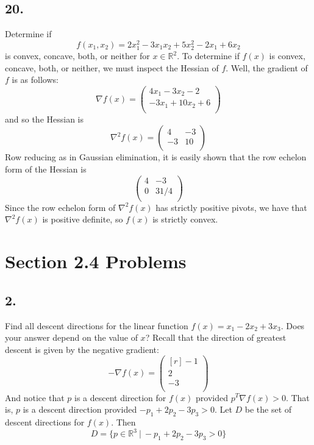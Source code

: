 \documentclass{article}
\begin{document}
\subsection*{20.} Determine if 
\[f(x_1,x_2) = 2x_1^2 - 3x_1x_2 + 5x_2^2 - 2x_1 + 6x_2\]
is convex, concave, both, or neither for $x \in \mathbb{R}^2$.
\newline\newline
To determine if $f(x)$ is convex, concave, both, or neither, we must inspect the Hessian of $f$. Well, the gradient of $f$ is as follows:
\[\nabla f(x) = \begin{pmatrix}
    4x_1 - 3x_2 - 2\\
    -3x_1 + 10x_2 + 6\\
\end{pmatrix}\]
and so the Hessian is
\[\nabla^2f(x) = \begin{pmatrix}
    4 & -3 \\
    -3 & 10\\
\end{pmatrix}\]
Row reducing as in Gaussian elimination, it is easily shown that the row echelon form of the Hessian is 
\[\begin{pmatrix}
    4 & -3\\
    0 & 31/4\\
\end{pmatrix}\]
Since the row echelon form of $\nabla^2f(x)$ has strictly positive pivots, we have that $\nabla^2f(x)$ is positive definite, so $f(x)$ is strictly convex.

\section*{Section 2.4 Problems}
\subsection*{2.} Find all descent directions for the linear function $f(x) = x_1 - 2x_2 + 3x_3$. Does your answer depend on the value of $x$?
\newline\newline
Recall that the direction of greatest descent is given by the negative gradient:
\[-\nabla f(x) = \begin{pmatrix*}[r]
    -1\\
    2\\
    -3\\
\end{pmatrix*}\]
And notice that $p$ is a descent direction for $f(x)$ provided $p^T\nabla f(x) > 0$. That is, $p$ is a descent direction provided $-p_1 + 2p_2 - 3p_3 > 0$. Let $D$ be the set of descent directions for $f(x)$. Then
\[D = \{p \in \mathbb{R}^3 \: | \: -p_1 + 2p_2 - 3p_3 > 0\}\]
\end{document}
